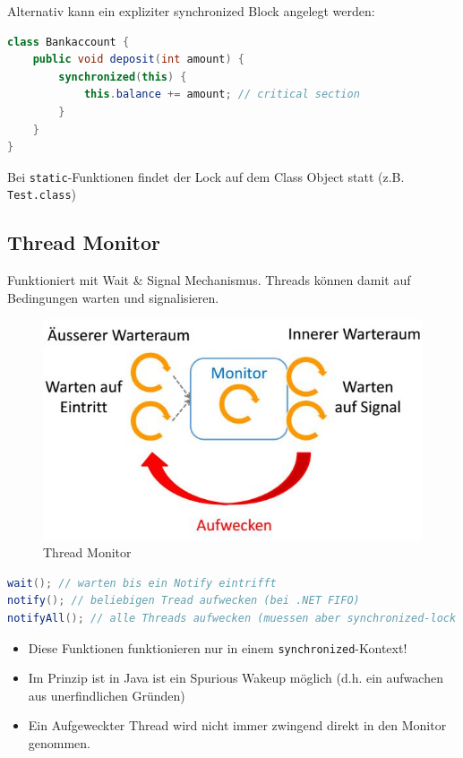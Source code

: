 Alternativ kann ein expliziter synchronized Block angelegt werden:

\begin{lstlisting}[language=java]
class Bankaccount {
	public void deposit(int amount) {
		synchronized(this) {
			this.balance += amount; // critical section
		}
	}
}
\end{lstlisting}

Bei \lstinline|static|-Funktionen findet der Lock auf dem Class Object statt (z.B. \lstinline|Test.class|)

\clearpage

\subsection{Thread Monitor}

Funktioniert mit Wait \& Signal Mechanismus. Threads können damit auf Bedingungen warten und signalisieren.


\begin{figure}[h!]
	\centering
	\includegraphics[width=0.7\linewidth]{img/thread_monitor}
	\caption{Thread Monitor}
	\label{fig:threadmonitor}
\end{figure}

\begin{lstlisting}[language=java]
wait(); // warten bis ein Notify eintrifft
notify(); // beliebigen Tread aufwecken (bei .NET FIFO)
notifyAll(); // alle Threads aufwecken (muessen aber synchronized-lock neu akquirieren
\end{lstlisting}


\begin{itemize}
	\item Diese Funktionen funktionieren nur in einem \lstinline|synchronized|-Kontext!
	\item Im Prinzip ist in Java ist ein Spurious Wakeup möglich (d.h. ein aufwachen aus unerfindlichen Gründen)
	\item Ein Aufgeweckter Thread wird nicht immer zwingend direkt in den Monitor genommen.
\end{itemize}

